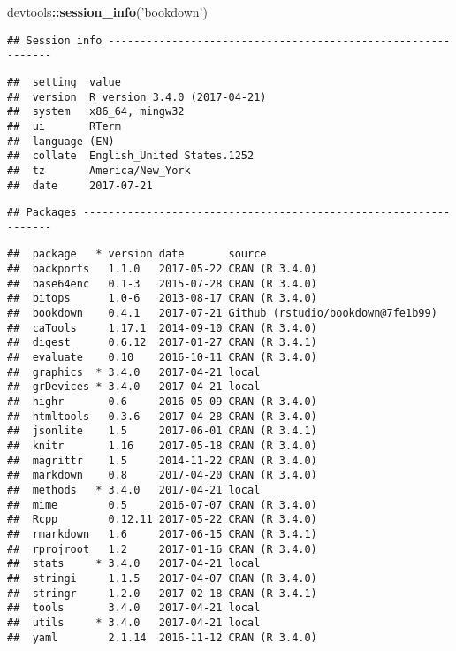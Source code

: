 \documentclass[]{article}
\newenvironment{Shaded}{\begin{snugshade}}{\end{snugshade}}
\newcommand{\KeywordTok}[1]{\textcolor[rgb]{0.13,0.29,0.53}{\textbf{#1}}}
\newcommand{\StringTok}[1]{\textcolor[rgb]{0.31,0.60,0.02}{#1}}
\newcommand{\OperatorTok}[1]{\textcolor[rgb]{0.81,0.36,0.00}{\textbf{#1}}}
\newcommand{\NormalTok}[1]{#1}
\begin{document}
\begin{Shaded}
\begin{Highlighting}[]
\NormalTok{devtools}\OperatorTok{::}\KeywordTok{session_info}\NormalTok{(}\StringTok{'bookdown'}\NormalTok{)}
\end{Highlighting}
\end{Shaded}

\begin{verbatim}
## Session info -------------------------------------------------------------
\end{verbatim}

\begin{verbatim}
##  setting  value                       
##  version  R version 3.4.0 (2017-04-21)
##  system   x86_64, mingw32             
##  ui       RTerm                       
##  language (EN)                        
##  collate  English_United States.1252  
##  tz       America/New_York            
##  date     2017-07-21
\end{verbatim}

\begin{verbatim}
## Packages -----------------------------------------------------------------
\end{verbatim}

\begin{verbatim}
##  package   * version date       source                           
##  backports   1.1.0   2017-05-22 CRAN (R 3.4.0)                   
##  base64enc   0.1-3   2015-07-28 CRAN (R 3.4.0)                   
##  bitops      1.0-6   2013-08-17 CRAN (R 3.4.0)                   
##  bookdown    0.4.1   2017-07-21 Github (rstudio/bookdown@7fe1b99)
##  caTools     1.17.1  2014-09-10 CRAN (R 3.4.0)                   
##  digest      0.6.12  2017-01-27 CRAN (R 3.4.1)                   
##  evaluate    0.10    2016-10-11 CRAN (R 3.4.0)                   
##  graphics  * 3.4.0   2017-04-21 local                            
##  grDevices * 3.4.0   2017-04-21 local                            
##  highr       0.6     2016-05-09 CRAN (R 3.4.0)                   
##  htmltools   0.3.6   2017-04-28 CRAN (R 3.4.0)                   
##  jsonlite    1.5     2017-06-01 CRAN (R 3.4.1)                   
##  knitr       1.16    2017-05-18 CRAN (R 3.4.0)                   
##  magrittr    1.5     2014-11-22 CRAN (R 3.4.0)                   
##  markdown    0.8     2017-04-20 CRAN (R 3.4.0)                   
##  methods   * 3.4.0   2017-04-21 local                            
##  mime        0.5     2016-07-07 CRAN (R 3.4.0)                   
##  Rcpp        0.12.11 2017-05-22 CRAN (R 3.4.0)                   
##  rmarkdown   1.6     2017-06-15 CRAN (R 3.4.1)                   
##  rprojroot   1.2     2017-01-16 CRAN (R 3.4.0)                   
##  stats     * 3.4.0   2017-04-21 local                            
##  stringi     1.1.5   2017-04-07 CRAN (R 3.4.0)                   
##  stringr     1.2.0   2017-02-18 CRAN (R 3.4.1)                   
##  tools       3.4.0   2017-04-21 local                            
##  utils     * 3.4.0   2017-04-21 local                            
##  yaml        2.1.14  2016-11-12 CRAN (R 3.4.0)
\end{verbatim}
\end{document}
